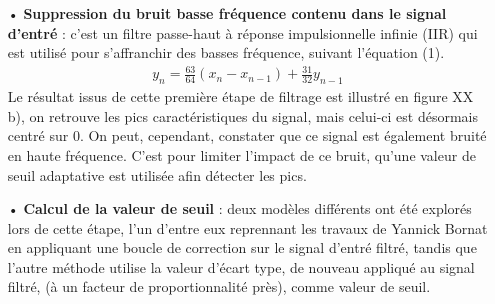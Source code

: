 \documentclass[a4paper,12pt]{article}
\begin{document}
\begin{itemize}
\item[•] \textbf{Suppression du bruit basse fréquence contenu dans le signal d'entré} : c'est un filtre passe-haut à réponse impulsionnelle infinie (IIR) qui est utilisé pour s'affranchir des basses fréquence, suivant l'équation (1).
\begin{eqnarray}
y_n = \frac{63}{64}\left(x_n - x_{n-1}\right) + \frac{31}{32}y_{n-1}
\end{eqnarray}
Le résultat issus de cette première étape de filtrage est illustré en figure XX b), on retrouve les pics caractéristiques du signal, mais celui-ci est désormais centré sur 0. On peut, cependant, constater que ce signal est également bruité en haute fréquence. C'est pour limiter l'impact de ce bruit, qu'une valeur de seuil adaptative est utilisée afin détecter les pics.\\

\item[•] \textbf{Calcul de la valeur de seuil} : deux modèles différents ont été explorés lors de cette étape, l'un d'entre eux reprennant les travaux de Yannick Bornat en appliquant une boucle de correction sur le signal d'entré filtré, tandis que l'autre méthode utilise la valeur d'écart type, de nouveau appliqué au signal filtré, (à un facteur de proportionnalité près), comme valeur de seuil.\\


\end{itemize}
\end{document}
